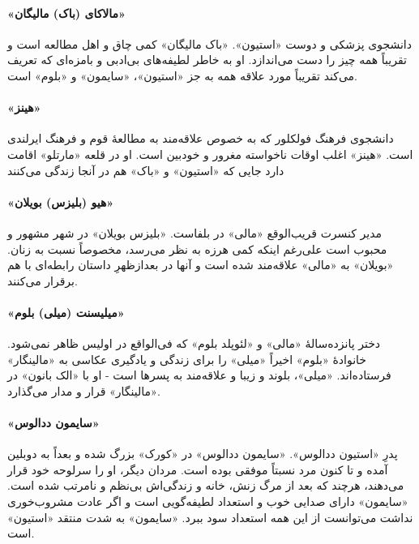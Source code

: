 \documentclass[12pt]{book}
\newcommand{\noun}[1]{«{#1}»}
\begin{document}
    \paragraph{\noun{مالاکای (باک)  مالیگان}\protect{}}
    دانشجوی پزشکی و دوست \noun{استیون}. \noun{باک مالیگان‬} کمی چاق و اهل مطالعه است و تقریباً همه چیز را دست می‌اندازد. او به خاطر لطیفه‌های بی‌ادبی و بامزه‌ای که تعریف می‌کند تقریباً مورد علاقه همه به جز \noun{استیون}، \noun{سایمون}  و \noun{بلوم} است.
    \paragraph{\noun{هینز}\protect{}}
    دانشجوی فرهنگ فولکلور که به خصوص علاقه‌مند به مطالعۀ قوم و فرهنگ ایرلندی است. \noun{هینز}  اغلب اوقات ناخواسته مغرور و خودبین است. او در قلعه \noun{مارتلو} اقامت دارد جایی که \noun{استیون} و \noun{باک}  هم در آنجا زندگی می‌کنند
    \paragraph{\noun{هیو (بلیزس) بویلان}\protect{}}
    مدیر کنسرت قریب‌الوقع \noun{مالی} در بلفاست. \noun{بلیزس بویلان‬} در شهر مشهور و محبوب است علی‌رغم اینکه کمی هرزه به نظر می‌رسد، مخصوصاً نسبت به زنان. \noun{بویلان} به \noun{مالی} علاقه‌مند شده است و آنها در بعدازظهرِ داستان رابطه‌ای با هم برقرار می‌کنند.
    \paragraph{\noun{میلیسنت (میلی) بلوم}\protect{}}
    دختر پانزده‌سالۀ \noun{مالی} و \noun{لئوپلد بلوم} که فی‌الواقع در اولیس ظاهر نمی‌شود. خانوادۀ \noun{بلوم} اخیراً \noun{میلی} را برای زندگی و یادگیری عکاسی به \noun{مالینگار} فرستاده‌اند. \noun{میلی}، بلوند و زیبا و علاقه‌مند به پسرها است - او با \noun{الک بانون} در \noun{مالینگار} قرار و مدار می‌گذارد.
    \paragraph{\noun{سایمون ددالوس}\protect{}}
    پدرِ \noun{استیون ددالوس}. \noun{سایمون  ددالوس} در \noun{کورک} بزرگ شده و بعداً به دوبلین آمده و تا کنون مرد نسبتاً موفقی بوده است. مردان دیگر، او را سرلوحه خود قرار می‌دهند، هرچند که بعد از مرگ زنش، خانه و زندگی‌اش بی‌نظم و نامرتب شده است. \noun{سایمون}  دارای صدایی خوب و استعداد لطیفه‌گویی است و اگر عادت مشروب‌خوری نداشت می‌توانست از این همه استعداد سود ببرد. \noun{سایمون}  به شدت منتقد \noun{استیون} است.
\end{document}
